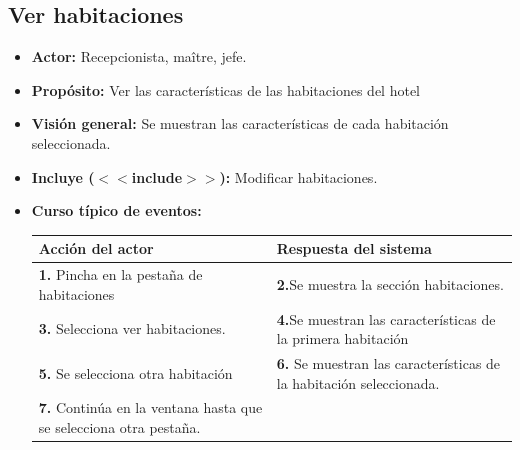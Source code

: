 \documentclass[spanish,a4paper,12pt]{report}	%
\begin{document}
	
	\hspace{-2 true cm}
	\subsection{Ver habitaciones}
		\begin{itemize}
			\item \textbf{Actor:} Recepcionista, maître, jefe.
			\item \textbf{Propósito: } Ver las características de las habitaciones del hotel
			\item \textbf{Visión general:} Se muestran las características de cada habitación seleccionada.
			\item \textbf{Incluye ($<<$include$>>$):} Modificar habitaciones.
			\item \textbf{Curso típico de eventos:} 	\\
				\begin{tabular}{|p{6cm}||p{6cm}|}
				\hline
				\textbf{Acción del actor} & \textbf{Respuesta del sistema} \\ \hline
				\textbf{1.} Pincha en la pestaña de habitaciones & \textbf{2.}Se muestra la sección habitaciones.\\ \hline 
				\textbf{3.} Selecciona ver habitaciones. & \textbf{4.}Se muestran las características de la primera habitación  \\ \hline
				\textbf{5.} Se selecciona otra habitación & \textbf{6.} Se muestran las características de la habitación seleccionada. \\ \hline
				\textbf{7.} Continúa en la ventana hasta que se selecciona otra pestaña. & \\ \hline
			\end{tabular}
			\\
		\end {itemize}
		
\end{document}
